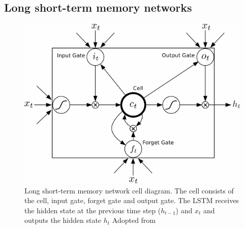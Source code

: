 \subsection{Long short-term memory networks}
\label{sec:lstm}

\begin{figure}
\includegraphics[scale=0.23]{lstm_2.png}
\caption{Long short-term memory network cell diagram. The cell consists of the 
	cell, input gate, forget gate and output gate. The LSTM receives
	the hidden state at the previous time step ($h_{t - 1}$) and $x_t$
	and outputs the hidden state $h_{t}$
	Adopted from 
\citep{graves2013hybrid} }
\label{fig:lstm_arch}
\end{figure}

